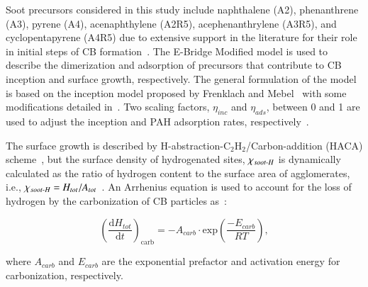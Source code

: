 Soot precursors considered in this study include naphthalene (A2), phenanthrene (A3), pyrene (A4), acenaphthylene (A2R5), acephenanthrylene (A3R5), and cyclopentapyrene (A4R5) due to extensive support in the literature for their role in initial steps of CB formation~\citep{mercier2019dimers, martin2019reactivity}. The E-Bridge Modified model is used to describe the dimerization and adsorption of precursors that contribute to CB inception and surface growth, respectively. The general formulation of the model is based on the inception model proposed by Frenklach and Mebel~\citep{frenklach2020mechanism} with some modifications detailed in~\citep{adib2025omnisoot}. Two scaling factors, $\eta_{inc}$ and $\eta_{ads}$, between 0 and 1 are used to adjust the inception and PAH adsorption rates, respectively~\citep{adib2025omnisoot}.

The surface growth is described by H-abstraction-$\mathrm{C_2H_2}$/Carbon-addition (HACA) scheme~\citep{appel2000kinetic}, but the surface density of hydrogenated sites, $\chi_{soot{\text-}H}$ is dynamically calculated as the ratio of hydrogen content to the surface area of agglomerates, i.e., $\chi_{soot{\text-}H}=H_{tot}/A_{tot}$~\citep{blanquart2009analyzing}. An Arrhenius equation is used to account for the loss of hydrogen by the carbonization of CB particles as~\citep{basile2002coagulation}:

\begin{equation}
	\left(\frac{\mathrm{d}H_{tot}}{\mathrm{d}t}\right)_{\mathrm{carb}}=
	-A_{carb}\cdot \mathrm{exp}(\frac{-E_{carb}}{RT}),
	\label{eqn:kads_ebir}
\end{equation}

\noindent where $A_{carb}$ and $E_{carb}$ are the exponential prefactor and activation energy for carbonization, respectively.